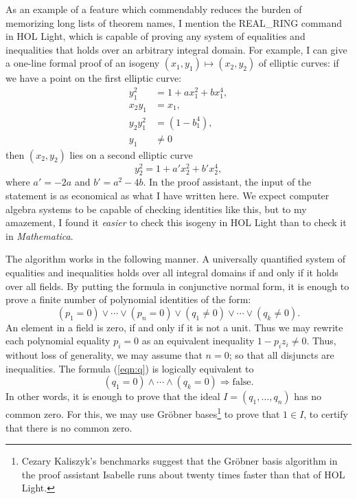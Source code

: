 \documentclass{llncs}
\begin{document}
As an example of a feature which commendably reduces the burden of
memorizing long lists of theorem names, I mention the {REAL\_RING} command in
HOL Light, 
which is capable of proving any system of equalities and
inequalities that holds over an arbitrary integral domain.  For
example, I can give a one-line formal proof of an isogeny $(x_1,y_1)
\mapsto (x_2,y_2)$ of elliptic curves: if we have a point on the first elliptic curve:
\begin{align*}
y_1^2 &= 1 + a x_1^2 + b x_1^4,\\
x_2 y_1&=x_1,\\
y_2 y_1^2&=(1 - b_1^4),\\
y_1&\ne 0
\end{align*}
then $(x_2,y_2)$ lies on a second elliptic curve
\[
y_2^2 = 1 + a' x_2^2 + b' x_2^4,
\]
where $a' = -2a$ and $b' = a^2 - 4b$.  In the proof assistant, 
the input of the
statement is as economical as what I have written here. We expect computer
algebra systems to be capable of checking identities like this, but to
my amazement, I found it {\it easier} to check this isogeny in HOL
Light than to check it in {\it Mathematica}.

The algorithm works in the following manner.  A universally
quantified system of equalities and inequalities holds over all integral
domains if and only if it holds over all fields.  
By putting the formula
in conjunctive normal form, it is enough to prove a finite number of
polynomial identities of the form:
\begin{equation}\label{eqn:q}
(p_1=0) \lor \cdots \lor (p_n=0) \lor (q_1\ne 0) \lor\cdots\lor (q_k\ne 0).
\end{equation}
An element in a field is zero, if and only if it is not a unit.  Thus we may
rewrite each polynomial equality $p_i=0$ as an equivalent inequality $1-p_i z_i\ne 0$.
Thus, without loss of generality, we may assume that $n=0$; so that all disjuncts
are inequalities.  The formula (\ref{eqn:q}) is logically equivalent to
\[
(q_1 =0) \land \cdots \land (q_k = 0) \Longrightarrow \text{false}.
\]
In other words, it is enough to prove that 
the ideal $I=(q_1,\ldots,q_n)$ has no common zero.  For this,
we may use Gr\"obner bases\footnote{
  Cezary Kaliszyk's benchmarks suggest that the Gr\"obner basis algorithm in 
the proof assistant Isabelle
  runs about twenty times faster than that of HOL Light.
}  to prove that $1\in I$, to certify that
there is no common zero.  
\end{document}
